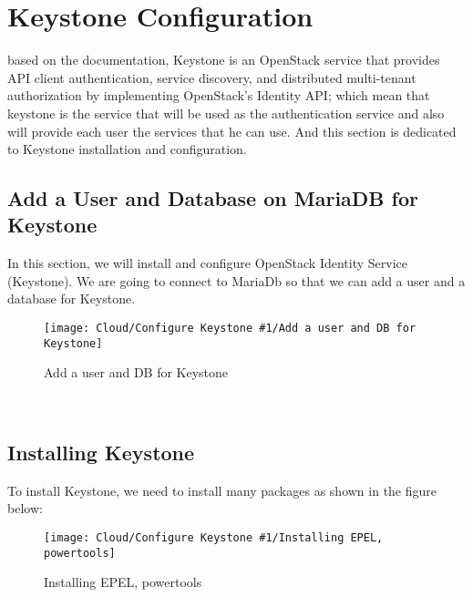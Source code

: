 \chapter{Keystone Configuration}
\par based on the documentation, Keystone is an OpenStack service that provides API client authentication, service discovery, and distributed multi-tenant authorization by implementing OpenStack’s Identity API; which mean that keystone is the service that will be used as the authentication service and also will provide each user the services that he can use. And this section is dedicated to Keystone installation and configuration.
\begin{spacing}{1.2}
\section{Add a User and Database on MariaDB for Keystone}

\par In this section, we will install and configure OpenStack Identity Service (Keystone). We
are going to connect to MariaDb so that we can add a user and a database
for Keystone. 
\\
\begin{figure}[!htb] 
\begin{center} 
\texttt{[image: Cloud/Configure Keystone \#1/Add a user and DB for Keystone]} 
\end{center} 
\caption{Add a user and DB for Keystone} 
\end{figure}  \FloatBarrier
\\


\section{Installing Keystone}

\par To install Keystone, we need to install many packages as shown in the
figure below: 
\\
\begin{figure}[!htb] 
\begin{center} 
\texttt{[image: Cloud/Configure Keystone \#1/Installing EPEL, powertools]} 
\end{center} 
\caption{Installing EPEL, powertools} 
\end{figure}  \FloatBarrier
\\



\end{spacing}
